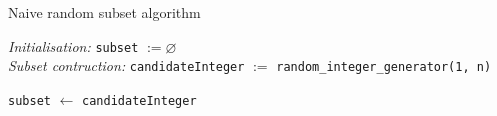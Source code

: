 \begin{algorithm}
	\caption{Naive random subset algorithm}
	\begin{algorithmic}[1]
			\BState \textit{Initialisation:}
				\State \verb|subset| $ := \varnothing$\\
			
			\BState \textit{Subset contruction:}
				\cprotect{}
					\State \verb|candidateInteger| $:=$ \verb|random_integer_generator(1, n)|
					
					\cprotect{}
						\State\verb|subset| $ \gets $ \verb|candidateInteger|
					\EndIf
				\EndWhile
	\end{algorithmic}
\end{algorithm}